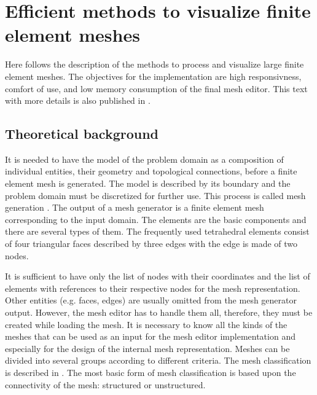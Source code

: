 \chapter{Efficient methods to visualize finite element meshes}
\label{chapter:mesh-visualization}

Here follows the description of the methods to process and visualize large finite element meshes. The objectives for the implementation are high responsivness, comfort of use, and low memory consumption of the final mesh editor. This text with more details is also published in \cite{Benes2015}.


\section{Theoretical background}

It is needed to have the model of the problem domain as a composition of individual entities, their geometry and topological connections, before a finite element mesh is generated. The model is described by its boundary and the problem domain must be discretized for further use. This process is called mesh generation \cite{XXX-2, XXX-3}. The output of a mesh generator is a finite element mesh corresponding to the input domain. The elements are the basic components and there are several types of them. The frequently used tetrahedral elements consist of four triangular faces described by three edges with the edge is made of two nodes.

It is sufficient to have only the list of nodes with their coordinates and the list of elements with references to their respective nodes for the mesh representation. Other entities (e.g. faces, edges) are usually omitted from the mesh generator output. However, the mesh editor has to handle them all, therefore, they must be created while loading the mesh. It is necessary to know all the kinds of the meshes that can be used as an input for the mesh editor implementation and especially for the design of the internal mesh representation. Meshes can be divided into several groups according to different criteria. The mesh classification is described in \cite{XXX-1}. The most basic form of mesh classification is based upon the connectivity of the mesh: structured or unstructured.

